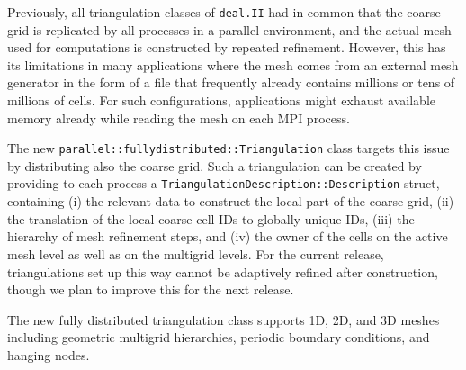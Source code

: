 \documentclass{ansarticle-preprint}
\newcommand{\specialword}[1]{\texttt{#1}}
\newcommand{\dealii}{{\specialword{deal.II}}\xspace}
\begin{document}
Previously, all triangulation classes of \dealii{} had in common that the coarse grid is replicated by
all processes in a parallel environment, and the actual mesh used for computations is constructed by repeated
refinement. However, this has its limitations in many
applications where the mesh comes
from an external mesh generator in the form of a file that frequently
already contains millions
or tens of millions of cells. For such configurations, applications might exhaust
available memory already while reading the mesh on each MPI process.

The new \texttt{parallel::fullydistributed::Triangulation} class targets this issue
by distributing also the coarse grid. Such
a triangulation can be created by providing to each process a \texttt{Triangulation\-De\-scrip\-tion::Description} struct, containing
(i) the relevant data to construct the local part of the coarse grid, (ii) the
translation of the local coarse-cell IDs to globally unique IDs, (iii) the hierarchy
of mesh refinement steps, and (iv) the owner of the cells on the active mesh level as well
as on the multigrid levels. For the current release, triangulations set up
this way cannot be adaptively refined after construction, though we plan to
improve this for the next release.



The new fully distributed triangulation class supports 1D, 2D, and 3D meshes
including geometric multigrid hierarchies, periodic boundary conditions, and
hanging nodes.
\end{document}
